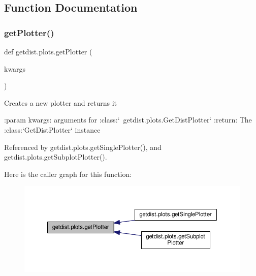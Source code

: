 \subsection{Function Documentation}
\mbox{\label{namespacegetdist_1_1plots_acebf6c49d9990fc724f3a726f2b1b8f9}} 
\subsubsection{\texorpdfstring{get\+Plotter()}{getPlotter()}}
{\footnotesize\ttfamily def getdist.\+plots.\+get\+Plotter (\begin{DoxyParamCaption}\item[{}]{kwargs }\end{DoxyParamCaption})}

\begin{DoxyVerb}Creates a new plotter and returns it

:param kwargs: arguments for :class:`~getdist.plots.GetDistPlotter`
:return: The :class:`GetDistPlotter` instance
\end{DoxyVerb}
 

Referenced by getdist.\+plots.\+get\+Single\+Plotter(), and getdist.\+plots.\+get\+Subplot\+Plotter().

Here is the caller graph for this function\+:
\nopagebreak
\begin{figure}[H]
\begin{center}
\leavevmode
\includegraphics[width=350pt]{namespacegetdist_1_1plots_acebf6c49d9990fc724f3a726f2b1b8f9_icgraph}
\end{center}
\end{figure}
\mbox{\label{namespacegetdist_1_1plots_a3b4916897da068a5f8018c216b631fcf}} 
